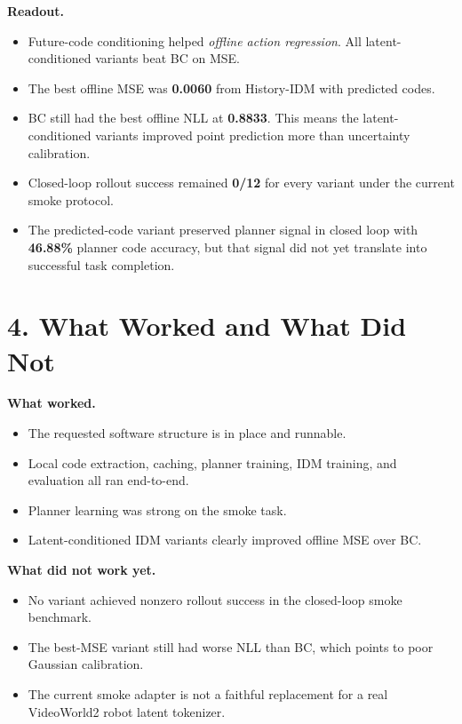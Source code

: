 \documentclass[11pt]{article}
\begin{document}
\textbf{Readout.}
\begin{itemize}[leftmargin=1.4em]
    \item Future-code conditioning helped \emph{offline action regression}. All latent-conditioned variants beat BC on MSE.
    \item The best offline MSE was \textbf{0.0060} from History-IDM with predicted codes.
    \item BC still had the best offline NLL at \textbf{0.8833}. This means the latent-conditioned variants improved point prediction more than uncertainty calibration.
    \item Closed-loop rollout success remained \textbf{0/12} for every variant under the current smoke protocol.
    \item The predicted-code variant preserved planner signal in closed loop with \textbf{46.88\%} planner code accuracy, but that signal did not yet translate into successful task completion.
\end{itemize}

\section*{4. What Worked and What Did Not}

\textbf{What worked.}
\begin{itemize}[leftmargin=1.4em]
    \item The requested software structure is in place and runnable.
    \item Local code extraction, caching, planner training, IDM training, and evaluation all ran end-to-end.
    \item Planner learning was strong on the smoke task.
    \item Latent-conditioned IDM variants clearly improved offline MSE over BC.
\end{itemize}

\textbf{What did not work yet.}
\begin{itemize}[leftmargin=1.4em]
    \item No variant achieved nonzero rollout success in the closed-loop smoke benchmark.
    \item The best-MSE variant still had worse NLL than BC, which points to poor Gaussian calibration.
    \item The current smoke adapter is not a faithful replacement for a real VideoWorld2 robot latent tokenizer.
\end{itemize}
\end{document}
